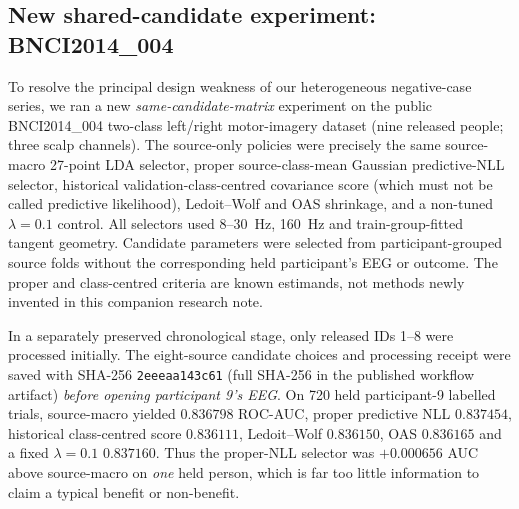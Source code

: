 \subsection{New shared-candidate experiment: BNCI2014\_004}
\label{sec:p3-bnci004-first-run}
To resolve the principal design weakness of our
heterogeneous negative-case series, we ran a new
\emph{same-candidate-matrix} experiment on the public
BNCI2014\_004 two-class left/right motor-imagery
dataset (nine released people; three scalp channels).
The source-only policies were precisely the same
source-macro 27-point LDA selector, proper
source-class-mean Gaussian predictive-NLL selector,
historical validation-class-centred covariance score
(which must not be called predictive likelihood),
Ledoit--Wolf and OAS shrinkage, and a non-tuned
$\lambda=0.1$ control. All selectors used 8--30~Hz,
160~Hz and train-group-fitted tangent geometry.
Candidate parameters were selected from
participant-grouped source folds without the
corresponding held participant's EEG or outcome.
The proper and class-centred criteria are
known estimands, not methods newly invented
in this companion research note.

In a separately preserved chronological stage, only
released IDs 1--8 were processed initially.
The eight-source candidate choices and processing
receipt were saved with SHA-256
\texttt{2eeeaa143c61} (full SHA-256 in the published workflow artifact)
\emph{before opening participant 9's EEG}.
On 720 held participant-9 labelled trials,
source-macro yielded $0.836798$ ROC-AUC,
proper predictive NLL $0.837454$,
historical class-centred score $0.836111$,
Ledoit--Wolf $0.836150$, OAS
$0.836165$ and a fixed $\lambda=0.1$
$0.837160$. Thus the proper-NLL selector
was $+0.000656$ AUC above source-macro
on \emph{one} held person, which
is far too little information to claim
a typical benefit or non-benefit.

